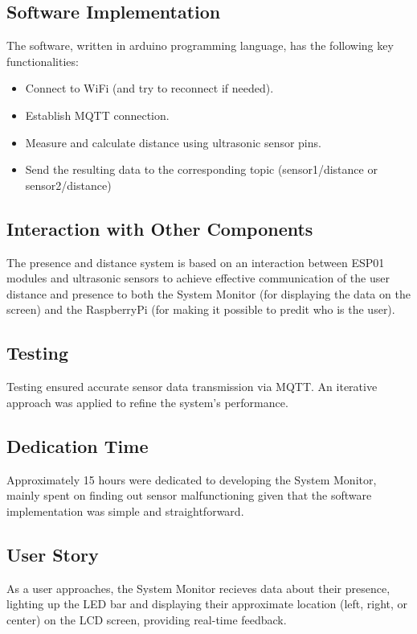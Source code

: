\documentclass{article}
\begin{document}
\subsection{Software Implementation}
The software, written in arduino programming language, has the following key functionalities:
\begin{itemize}
    \item Connect to WiFi (and try to reconnect if needed).
    \item Establish MQTT connection.
    \item Measure and calculate distance using ultrasonic sensor pins.
    \item Send the resulting data to the corresponding topic (sensor1/distance or sensor2/distance)
\end{itemize}

\subsection{Interaction with Other Components}
The presence and distance system is based on an interaction between ESP01 modules and ultrasonic sensors to achieve effective communication of the user distance and presence to both the System Monitor (for displaying the data on the screen) and the RaspberryPi (for making it possible to predit who is the user).

\subsection{Testing}
Testing ensured accurate sensor data transmission via MQTT. An iterative approach was applied to refine the system's performance.

\subsection{Dedication Time}
Approximately 15 hours were dedicated to developing the System Monitor, mainly spent on finding out sensor malfunctioning given that the software implementation was simple and straightforward.

\subsection{User Story}
As a user approaches, the System Monitor recieves data about their presence, lighting up the LED bar and displaying their approximate location (left, right, or center) on the LCD screen, providing real-time feedback.
\end{document}
